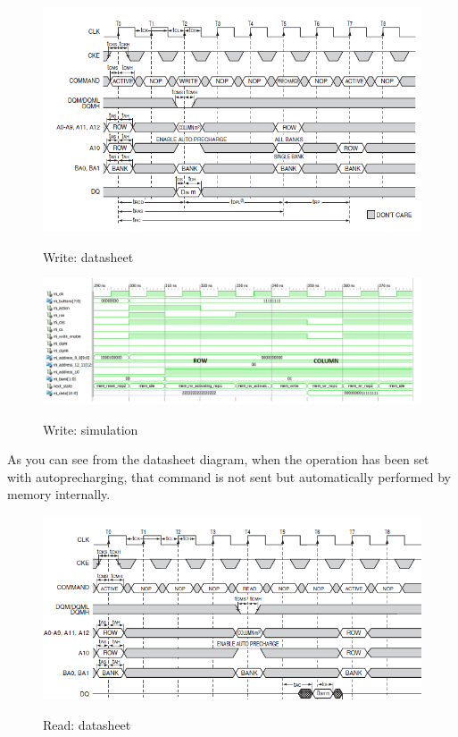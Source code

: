 \begin{figure}[H]
\centering
\includegraphics[scale=.9]{Immagini/31}
\label{31}
\caption{Write: datasheet}
\end{figure}

\begin{figure}[H]
\centering
\includegraphics[scale=.5]{Immagini/30}
\label{30}
\caption{Write: simulation}
\end{figure}

\newpage

As you can see from the datasheet diagram, when the operation has been set with autoprecharging, that command is not sent but automatically performed by memory internally. 

\begin{figure}[H]
\centering
\includegraphics[scale=.9]{Immagini/33}
\label{33}
\caption{Read: datasheet}
\end{figure}

